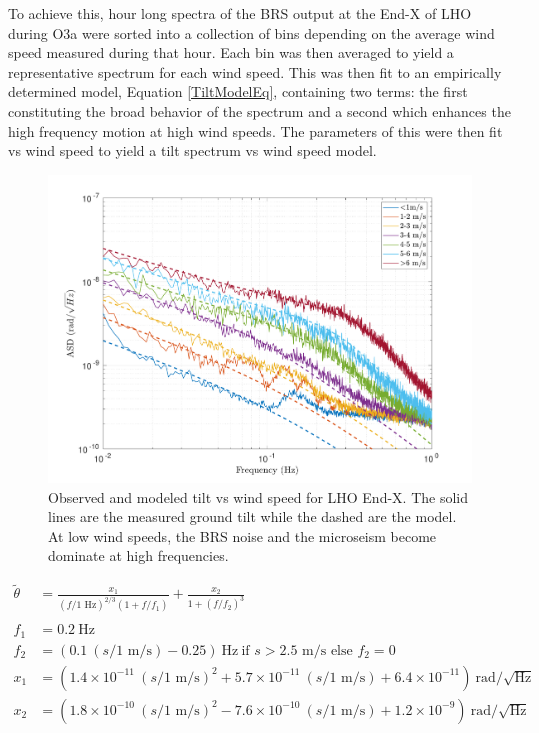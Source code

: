 \documentclass [12pt, proquest]{uwthesis}[2019]
\begin{document}
To achieve this, hour long spectra of the BRS output at the End-X of LHO during O3a were sorted into a collection of bins depending on the average wind speed measured during that hour. Each bin was then averaged to yield a representative spectrum for each wind speed. This was then fit to an empirically determined model, Equation \ref{TiltModelEq}, containing two terms: the first constituting the broad behavior of the spectrum and a second which enhances the high frequency motion at high wind speeds. The parameters of this were then fit vs wind speed to yield a tilt spectrum vs wind speed model. 

\begin{figure}[!h]
\begin{center}
\includegraphics[width=\textwidth]{TiltModel.pdf}
\caption[Observed and modeled tilt vs wind speed]{Observed and modeled tilt vs wind speed for LHO End-X. The solid lines are the measured ground tilt while the dashed are the model. At low wind speeds, the BRS noise and the microseism become dominate at high frequencies.}
\label{tiltModel}
\end{center}
\end{figure}

\begin{align}
\tilde{\theta}&=\frac{x_1}{(f/1\text{ Hz})^{2/3}(1+f/f_1)} +\frac{x_2}{1+(f/f_2)^3}\label{TiltModelEq}\\
\nonumber \\ 
f_1&=0.2\ \text{Hz}\nonumber \\
f_2&=(0.1\ (s/\text{1 m/s}) -0.25)\ \text{Hz}\ \text{if }s>2.5\text{ m/s}\text{ else }f_2=0\nonumber \\
x_1&=(1.4\times10^{-11}\ (s/\text{1 m/s})^2+5.7\times10^{-11}\ (s/\text{1 m/s})+6.4\times10^{-11})\ \text{rad}/\sqrt{\text{Hz}}\nonumber \\
x_2&=(1.8\times10^{-10}\ (s/\text{1 m/s})^2-7.6\times10^{-10}\ (s/\text{1 m/s})+1.2\times10^{-9})\ \text{rad}/\sqrt{\text{Hz}}\nonumber
\end{align}
\end{document}
